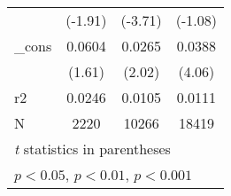 \begin{table}[htbp]
\begin{tabular}{l*{3}{c}}
            &     (-1.91)         &     (-3.71)         &     (-1.08)         \\
[1em]
\_cons      &      0.0604         &      0.0265\sym{*}  &      0.0388\sym{***}\\
            &      (1.61)         &      (2.02)         &      (4.06)         \\
\hline
r2          &      0.0246         &      0.0105         &      0.0111         \\
N           &        2220         &       10266         &       18419         \\
\hline\hline
\multicolumn{4}{l}{\footnotesize \textit{t} statistics in parentheses}\\
\multicolumn{4}{l}{\footnotesize \sym{*} \(p<0.05\), \sym{**} \(p<0.01\), \sym{***} \(p<0.001\)}\\
\end{tabular}
\end{table}
